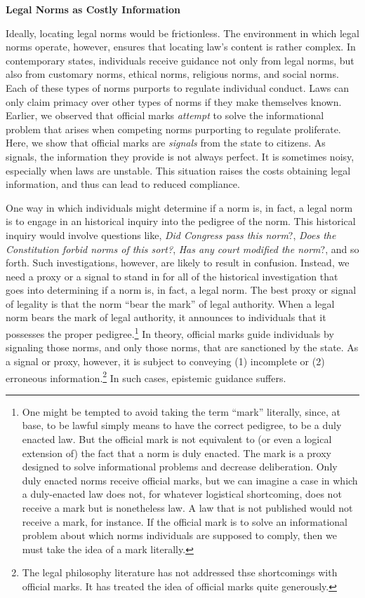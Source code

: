 \textbf{Legal Norms as Costly Information}

Ideally, locating legal norms would be frictionless. The environment in
which legal norms operate, however, ensures that locating law's content
is rather complex. In contemporary states, individuals receive guidance
not only from legal norms, but also from customary norms, ethical norms,
religious norms, and social norms. Each of these types of norms purports
to regulate individual conduct. Laws can only claim primacy over other
types of norms if they make themselves known. Earlier, we observed that
official marks \emph{attempt} to solve the informational problem that
arises when competing norms purporting to regulate proliferate. Here, we
show that official marks are \emph{signals} from the state to citizens.
As signals, the information they provide is not always perfect. It is
sometimes noisy, especially when laws are unstable. This situation
raises the costs obtaining legal information, and thus can lead to
reduced compliance.

One way in which individuals might determine if a norm is, in fact, a
legal norm is to engage in an historical inquiry into the pedigree of
the norm. This historical inquiry would involve questions like,
\emph{Did Congress pass this norm}?, \emph{Does the Constitution forbid
norms of this sort?}, \emph{Has any court modified the norm}?, and so
forth. Such investigations, however, are likely to result in confusion.
Instead, we need a proxy or a signal to stand in for all of the
historical investigation that goes into determining if a norm is, in
fact, a legal norm. The best proxy or signal of legality is that the
norm ``bear the mark'' of legal authority. When a legal norm bears the
mark of legal authority, it announces to individuals that it possesses
the proper pedigree.\footnote{One might be tempted to avoid taking the
  term ``mark'' literally, since, at base, to be lawful simply means to
  have the correct pedigree, to be a duly enacted law. But the official
  mark is not equivalent to (or even a logical extension of) the fact
  that a norm is duly enacted. The mark is a proxy designed to solve
  informational problems and decrease deliberation. Only duly enacted
  norms receive official marks, but we can imagine a case in which a
  duly-enacted law does not, for whatever logistical shortcoming, does
  not receive a mark but is nonetheless law. A law that is not published
  would not receive a mark, for instance. If the official mark is to
  solve an informational problem about which norms individuals are
  supposed to comply, then we must take the idea of a mark literally.}
In theory, official marks guide individuals by signaling those norms,
and only those norms, that are sanctioned by the state. As a signal or
proxy, however, it is subject to conveying (1) incomplete or (2)
erroneous information.\footnote{The legal philosophy literature has not
  addressed thse shortcomings with official marks. It has treated the
  idea of official marks quite generously.} In such cases, epistemic
guidance suffers.

